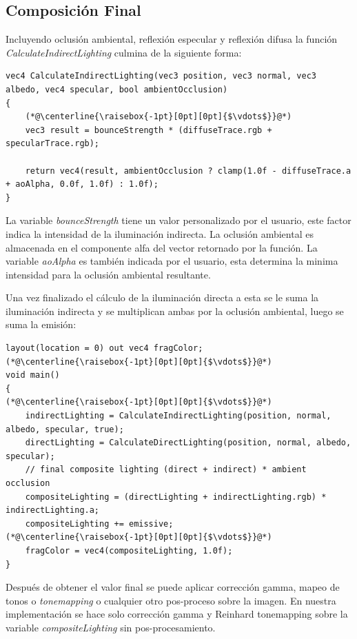 \subsection{Composición Final} %
\label{sub:composicion_final}
Incluyendo oclusión ambiental, reflexión especular y reflexión difusa la función \emph{CalculateIndirectLighting} culmina de la siguiente forma:
\\
\begin{lstlisting}[caption={Composición para la iluminación indirecta.}, label=Trace6]
vec4 CalculateIndirectLighting(vec3 position, vec3 normal, vec3 albedo, vec4 specular, bool ambientOcclusion)
{
    (*@\centerline{\raisebox{-1pt}[0pt][0pt]{$\vdots$}}@*)
    vec3 result = bounceStrength * (diffuseTrace.rgb + specularTrace.rgb);

    return vec4(result, ambientOcclusion ? clamp(1.0f - diffuseTrace.a + aoAlpha, 0.0f, 1.0f) : 1.0f);
}
\end{lstlisting}
La variable \emph{bounceStrength} tiene un valor personalizado por el usuario, este factor indica la intensidad de la iluminación indirecta. La oclusión ambiental es almacenada en el componente alfa del vector retornado por la función. La variable \emph{aoAlpha} es también indicada por el usuario, esta determina la minima intensidad para la oclusión ambiental resultante.

Una vez finalizado el cálculo de la iluminación directa a esta se le suma la iluminación indirecta y se multiplican ambas por la oclusión ambiental, luego se suma la emisión:
\\
\begin{lstlisting}[caption={Composición final de imagen.}, label=Trace7]
layout(location = 0) out vec4 fragColor;
(*@\centerline{\raisebox{-1pt}[0pt][0pt]{$\vdots$}}@*)
void main()
{
(*@\centerline{\raisebox{-1pt}[0pt][0pt]{$\vdots$}}@*)
    indirectLighting = CalculateIndirectLighting(position, normal, albedo, specular, true);
    directLighting = CalculateDirectLighting(position, normal, albedo, specular);
    // final composite lighting (direct + indirect) * ambient occlusion
    compositeLighting = (directLighting + indirectLighting.rgb) * indirectLighting.a;
    compositeLighting += emissive;
(*@\centerline{\raisebox{-1pt}[0pt][0pt]{$\vdots$}}@*)
    fragColor = vec4(compositeLighting, 1.0f);
}
\end{lstlisting}
Después de obtener el valor final se puede aplicar corrección gamma, mapeo de tonos o \emph{tonemapping} o cualquier otro pos-proceso sobre la imagen. En nuestra implementación se hace solo corrección gamma y Reinhard tonemapping sobre la variable \emph{compositeLighting} sin pos-procesamiento.
